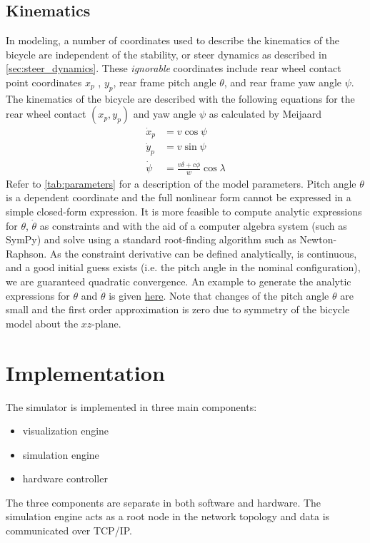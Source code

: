 \documentclass[11pt,a4paper,reqno]{amsart}
\newcommand{\x}{x_{p}}
\newcommand{\y}{y_{p}}
\newcommand{\pitch}{\theta}
\newcommand{\yaw}{\psi}
\newcommand{\steer}{\delta}
\newcommand{\dx}{\dot{x}_{p}}
\newcommand{\dy}{\dot{y}_{p}}
\newcommand{\pitchRate}{\dot{\theta}}
\newcommand{\yawRate}{\dot{\psi}}
\newcommand{\steerRate}{\dot{\phi}}
\begin{document}
\subsection{Kinematics}

In modeling, a number of coordinates used to describe the kinematics of the bicycle are independent of the stability, or
steer dynamics as described in \autoref{sec:steer_dynamics}.
These \textit{ignorable} coordinates include
rear wheel contact point coordinates $ x_p $ , $ y_p $,
rear frame pitch angle $ \pitch $, and rear frame yaw angle $ \yaw $.
The kinematics of the bicycle are described with the following equations for the rear wheel contact $ (\x, \y) $ and
yaw angle $ \yaw $ as calculated by Meijaard\cite{meijaard2007}
\begin{equation}
\begin{aligned}
    \dx &= v \cos{\yaw} \\
    \dy &= v \sin{\yaw} \\
    \yawRate &= \frac{v \steer + c \steerRate}{w} \cos{\lambda} \label{eq:kineq}
\end{aligned}
\end{equation}
Refer to \autoref{tab:parameters} for a description of the model parameters.
Pitch angle $ \pitch $ is a dependent coordinate and the full nonlinear form cannot be expressed in a simple closed-form
expression.
It is more feasible to compute analytic expressions for $ \pitch $, $ \pitchRate $ as constraints and with the aid of a
computer algebra system (such as SymPy\cite{sympy}) and solve using a standard root-finding algorithm such as
Newton-Raphson.
As the constraint derivative can be defined analytically, is continuous, and a good initial guess exists (i.e. the pitch
angle in the nominal configuration), we are guaranteed quadratic convergence.
An example to generate the analytic expressions for $ \pitch$ and $ \pitchRate $ is given
\href{https://github.com/oliverlee/bicycle/blob/master/python/pitch_constraint.py}{here}.
Note that changes of the pitch angle $ \pitch $ are small and the first order approximation is zero due to symmetry of
the bicycle model about the $ xz $-plane.

\section{Implementation}
The simulator is implemented in three main components:
\begin{itemize}
    \item visualization engine
    \item simulation engine
    \item hardware controller
\end{itemize}
The three components are separate in both software and hardware.
The simulation engine acts as a root node in the network topology and data is communicated over TCP/IP.
\end{document}
